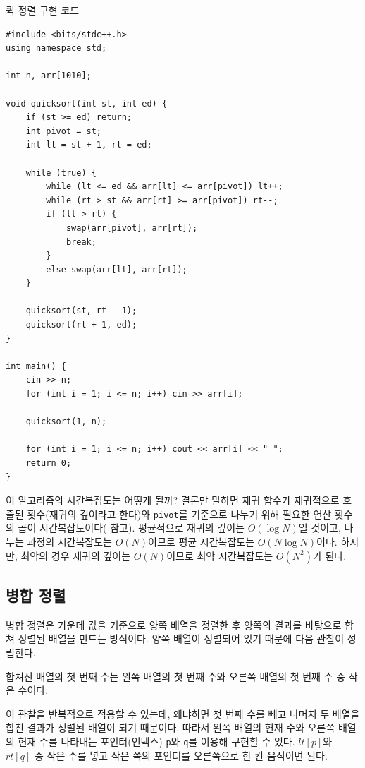 \begin{code} \label{code: quicksort}
퀵 정렬 구현 코드
\begin{lstlisting}
#include <bits/stdc++.h>
using namespace std;

int n, arr[1010];

void quicksort(int st, int ed) {
    if (st >= ed) return;
    int pivot = st;
    int lt = st + 1, rt = ed;

    while (true) {
        while (lt <= ed && arr[lt] <= arr[pivot]) lt++;
        while (rt > st && arr[rt] >= arr[pivot]) rt--;
        if (lt > rt) {
            swap(arr[pivot], arr[rt]);
            break;
        }
        else swap(arr[lt], arr[rt]);
    }

    quicksort(st, rt - 1);
    quicksort(rt + 1, ed);
}

int main() {
    cin >> n;
    for (int i = 1; i <= n; i++) cin >> arr[i];

    quicksort(1, n);

    for (int i = 1; i <= n; i++) cout << arr[i] << " ";
    return 0;
}

\end{lstlisting}
\end{code}

이 알고리즘의 시간복잡도는 어떻게 될까? 결론만 말하면 재귀 함수가 재귀적으로 호출된 횟수(재귀의 깊이라고 한다)와 \texttt{pivot}를 기준으로 나누기 위해 필요한 연산 횟수의 곱이 시간복잡도이다( 참고). 평균적으로 재귀의 깊이는 $O(\log N)$일 것이고, 나누는 과정의 시간복잡도는 $O(N)$이므로 평균 시간복잡도는 $O(N \log N)$이다. 하지만, 최악의 경우 재귀의 깊이는 $O(N)$이므로 최악 시간복잡도는 $O(N^2)$가 된다.

\subsection{병합 정렬} \label{sec: mergesort}
병합 정렬은 가운데 값을 기준으로 양쪽 배열을 정렬한 후 양쪽의 결과를 바탕으로 합쳐 정렬된 배열을 만드는 방식이다. 양쪽 배열이 정렬되어 있기 때문에 다음 관찰이 성립한다.

\begin{obs}
    합쳐진 배열의 첫 번째 수는 왼쪽 배열의 첫 번째 수와 오른쪽 배열의 첫 번째 수 중 작은 수이다.
\end{obs}

이 관찰을 반복적으로 적용할 수 있는데, 왜냐하면 첫 번째 수를 빼고 나머지 두 배열을 합친 결과가 정렬된 배열이 되기 때문이다. 따라서 왼쪽 배열의 현재 수와 오른쪽 배열의 현재 수를 나타내는 포인터(인덱스) \texttt{p}와 \texttt{q}를 이용해 구현할 수 있다. $lt[p]$와 $rt[q]$ 중 작은 수를 넣고 작은 쪽의 포인터를 오른쪽으로 한 칸 움직이면 된다.


